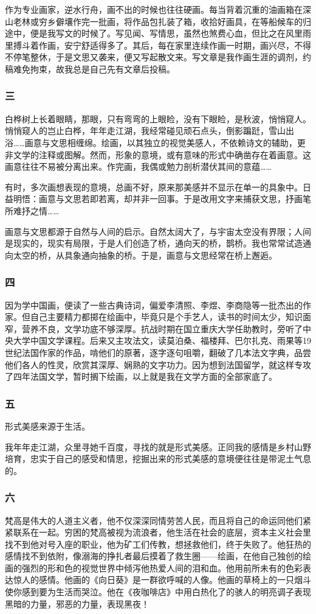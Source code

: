 \documentclass{article}
\begin{document}
作为专业画家，逆水行舟，画不出的时候也往往硬画。每当背着沉重的油画箱在深山老林或穷乡僻壤作完一批画，将作品包扎装了箱，收拾好画具，在等船候车的归途中，便是我写文的时候了。写见闻、写情思，虽然也煞费心血，但比之在风里雨里搏斗着作画，安宁舒适得多了。其后，每在家里连续作画一时期，画兴尽，不得不停笔整休，于是文思又袭来，便又写起散文来。写文章是我作画生涯的调剂，约稿难免拘束，故我总是自己先有文章后投稿。
\subsubsection{三}
白桦树上长着眼睛，那眼，只有弯弯的上眼睑，没有下眼睑，是秋波，悄悄窥人。悄悄窥人的岂止白桦，年年走江湖，我经常碰见顽石点头，倒影蹁跹，雪山出浴……画意与文思相缠绵。绘画，以其独立的视觉美感人，不依赖诗文的辅助，更非文学的注释或图解。然而，形象的意境，或有意味的形式中确凿存在着画意。这画意往往不易被分离出来。作完画，我偶或勉力剖析潜伏其间的意蕴……

有时，多次画想表现的意境，总画不好，原来那美感并不显示在单一的具象中。日益明悟：画意与文思若即若离，却并非一回事。于是改用文字来捕获文思，抒画笔所难抒之情……

画意与文思都源于自然与人间的启示。自然太阔大了，与宇宙太空没有界限；人间是现实的，现实有局限，于是人们创造了桥，通向天的桥，鹊桥。我也常常试造通向太空的桥，从具象通向抽象的桥。于是，画意与文思经常在桥上邂逅。
\subsubsection{四}
因为学中国画，便读了一些古典诗词，偏爱李清照、李煜、李商隐等一批杰出的作家。但自己主要精力都掷在绘画中，毕竟只是个手艺人，读书的时间太少，知识面窄，营养不良，文学功底不够深厚。抗战时期在国立重庆大学任助教时，旁听了中央大学中国文学课程。后来又主攻法文，读莫泊桑、福楼拜、巴尔扎克、雨果等19世纪法国作家的作品，啃他们的原著，逐字逐句咀嚼，翻破了几本法文字典，品尝他们各人的性灵，欣赏其深厚、娴熟的文字功力。因为想到法国留学，就这样专攻了四年法国文学，暂时搁下绘画，以上就是我在文学方面的全部家底了。
\subsubsection{五}
形式美感来源于生活。

我年年走江湖，众里寻她千百度，寻找的就是形式美感。正同我的感情是乡村山野培育，忠实于自己的感受和情思，挖掘出来的形式美感的意境便往往是带泥土气息的。
\subsubsection{六}
梵高是伟大的人道主义者，他不仅深深同情劳苦人民，而且将自己的命运同他们紧紧联系在一起。穷困的梵高被视为流浪者，他生活在社会的底层，资本主义社会里找不到他对号入座的职业，他为矿工们传教，想拯救他们，终于失败了。他狂热的感情找不到依附，像溺海的挣扎者最后摸着了救生圈——绘画，在他自己独创的绘画的强烈的形和色的视觉世界中倾泻他热爱人间的泪和血。他用前所未有的色彩表达惊人的感情。他画的《向日葵》是一群欲呼喊的人像。他画的草椅上的一只烟斗使你感到要为生活而哭泣。他在《夜咖啡店》中用白热化了的骇人的明亮调子表现黑暗的力量，邪恶的力量，表现黑夜！
\end{document}
